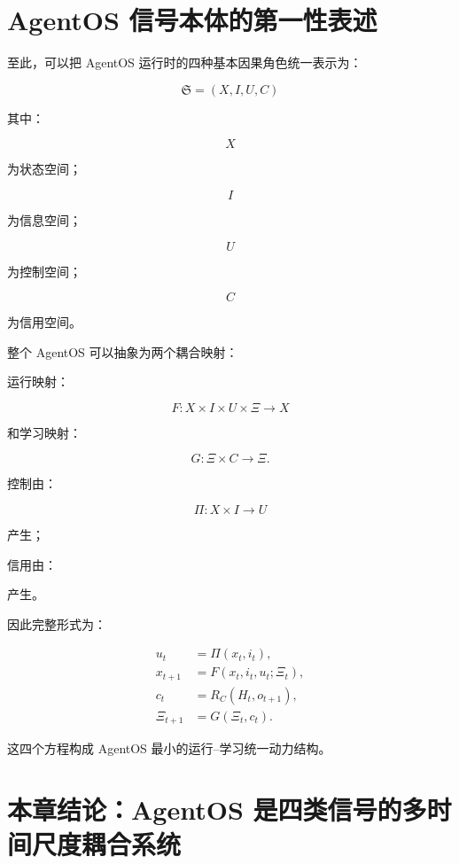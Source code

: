\section{AgentOS 信号本体的第一性表述}

至此，可以把 AgentOS 运行时的四种基本因果角色统一表示为：

\[
\boxed{
\mathfrak S
=
(
X,I,U,C
)
}
\]

其中：

\[
X
\]

为状态空间；

\[
I
\]

为信息空间；

\[
U
\]

为控制空间；

\[
C
\]

为信用空间。

整个 AgentOS 可以抽象为两个耦合映射：

运行映射：

\[
\boxed{
F:
X\times I\times U\times\Xi
\rightarrow X
}
\]

和学习映射：

\[
\boxed{
G:
\Xi\times C
\rightarrow\Xi.
}
\]

控制由：

\[
\boxed{
\Pi:
X\times I
\rightarrow U
}
\]

产生；

信用由：

\begin{statementbox}
\centering
{}
\end{statementbox}

产生。

因此完整形式为：

\[
\boxed{
\begin{aligned}
u_t
&=
\Pi(x_t,i_t),
\\
x_{t+1}
&=
F(x_t,i_t,u_t;\Xi_t),
\\
c_t
&=
R_C(H_t,o_{t+1}),
\\
\Xi_{t+1}
&=
G(\Xi_t,c_t).
\end{aligned}
}
\]

这四个方程构成 AgentOS 最小的运行--学习统一动力结构。

\section{本章结论：AgentOS 是四类信号的多时间尺度耦合系统}

